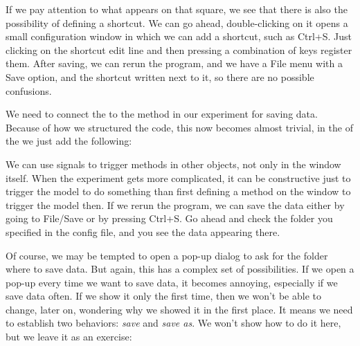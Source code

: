 If we pay attention to what appears on that square, we see that there is also the possibility of defining a shortcut. We can go ahead, double-clicking on it opens a small configuration window in which we can add a shortcut, such as Ctrl+S. Just clicking on the shortcut edit line and then pressing a combination of keys register them. After saving, we can rerun the program, and we have a File menu with a Save option, and the shortcut written next to it, so there are no possible confusions.

We need to connect the  to the method in our experiment for saving data. Because of how we structured the code, this now becomes almost trivial, in the  of the  we just add the following:


We can use signals to trigger methods in other objects, not only in the window itself. When the experiment gets more complicated, it can be constructive just to trigger the model to do something than first defining a method on the window to trigger the model then. If we rerun the program, we can save the data either by going to File/Save or by pressing Ctrl+S. Go ahead and check the folder you specified in the config file, and you see the data appearing there.


Of course, we may be tempted to open a pop-up dialog to ask for the folder where to save data. But again, this has a complex set of possibilities. If we open a pop-up every time we want to save data, it becomes annoying, especially if we save data often. If we show it only the first time, then we won't be able to change, later on, wondering why we showed it in the first place. It means we need to establish two behaviors: \emph{save} and \emph{save as}. We won't show how to do it here, but we leave it as an exercise:

